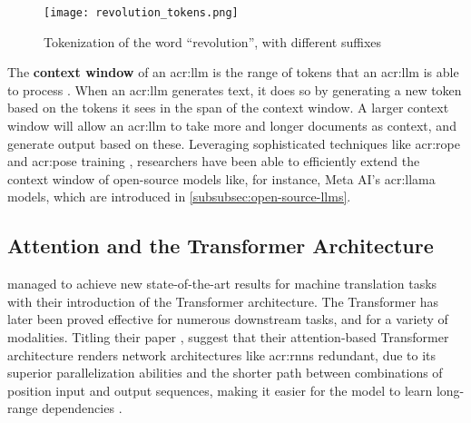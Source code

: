 \begin{figure}[htp]
    \centering
    \texttt{[image: revolution\_tokens.png]}
    \caption{Tokenization of the word \enquote{revolution}, with different suffixes}
    \label{fig:tokenization-revolution}
\end{figure}

The \textbf{context window} of an \acrshort{acr:llm} is the range of tokens that an \acrshort{acr:llm} is able to process \citep[1]{zhuPoSEEfficientContext2024}. When an \acrshort{acr:llm} generates text, it does so by generating a new token based on the tokens it sees in the span of the context window. A larger context window will allow an \acrshort{acr:llm} to take more and longer documents as context, and generate output based on these. Leveraging sophisticated techniques like \gls{acr:rope} \citep{suRoFormerEnhancedTransformer2024} and \gls{acr:pose} training \citep{zhuPoSEEfficientContext2024}, researchers have been able to efficiently extend the context window of open-source models like, for instance, Meta AI's \acrshort{acr:llama} models, which are introduced in \autoref{subsubsec:open-source-llms}.


\subsection{Attention and the Transformer Architecture}
\label{subsec:attention-and-the-transformer-architecture}

\cite{vaswaniAttentionAllYou2017} managed to achieve new state-of-the-art results for machine translation tasks with their introduction of the Transformer architecture. The Transformer has later been proved effective for numerous downstream tasks, and for a variety of modalities. Titling their paper , \citeauthor{vaswaniAttentionAllYou2017} suggest that their attention-based Transformer architecture renders network architectures like \glspl{acr:rnn} redundant, due to its superior parallelization abilities and the shorter path between combinations of position input and output sequences, making it easier for the model to learn long-range dependencies \citep[6]{vaswaniAttentionAllYou2017}.

